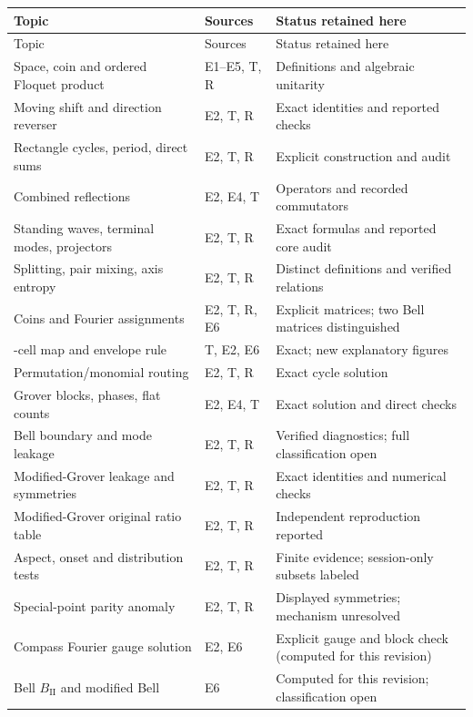 \documentclass[11pt,a4paper,oneside]{report}
\numberwithin{equation}{chapter}
\begin{document}
\begin{longtable}{@{}>{\raggedright\arraybackslash}p{}>{\raggedright\arraybackslash}p{}>{\raggedright\arraybackslash}p{}@{}}
\toprule Topic & Sources & Status retained here\\\midrule\endfirsthead
\toprule Topic & Sources & Status retained here\\\midrule\endhead
Space, coin and ordered Floquet product & E1--E5, T, R & Definitions and algebraic unitarity\\
Moving shift and direction reverser & E2, T, R & Exact identities and reported checks\\
Rectangle cycles, period, direct sums & E2, T, R & Explicit construction and audit\\
Combined reflections & E2, E4, T & Operators and recorded commutators\\
Standing waves, terminal modes, projectors & E2, T, R & Exact formulas and reported core audit\\
Splitting, pair mixing, axis entropy & E2, T, R & Distinct definitions and verified relations\\
Coins and Fourier assignments & E2, T, R, E6 & Explicit matrices; two Bell matrices distinguished\\
16-cell map and envelope rule & T, E2, E6 & Exact; new explanatory figures\\
Permutation/monomial routing & E2, T, R & Exact cycle solution\\
Grover blocks, phases, flat counts & E2, E4, T & Exact solution and direct checks\\
Bell boundary and mode leakage & E2, T, R & Verified diagnostics; full classification open\\
Modified-Grover leakage and symmetries & E2, T, R & Exact identities and numerical checks\\
Modified-Grover original ratio table & E2, T, R & Independent reproduction reported\\
Aspect, onset and distribution tests & E2, T, R & Finite evidence; session-only subsets labeled\\
Special-point parity anomaly & E2, T, R & Displayed symmetries; mechanism unresolved\\
Compass Fourier gauge solution & E2, E6 & Explicit gauge and block check (computed for this revision)\\
Bell \(B_{\mathrm{II}}\) and modified Bell & E6 & Computed for this revision; classification open\\

\end{longtable}
\end{document}
